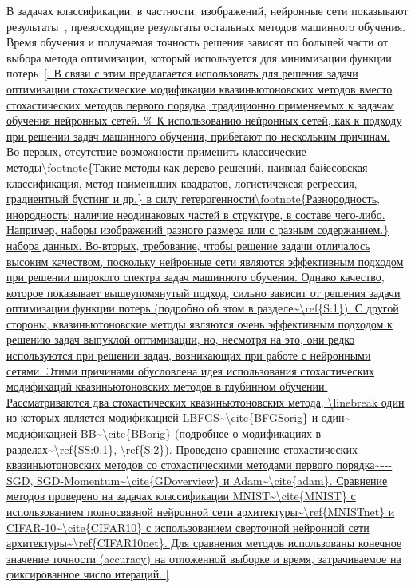 \documentclass[preprint,12pt]{elsarticle}
\begin{document}
В задачах классификации, в частности, изображений, нейронные сети показывают результаты~\cite{MNISTexperiments, CIFAR10experiments}, превосходящие результаты остальных методов машинного обучения. 
Время обучения и получаемая точность решения зависят по большей части от выбора метода оптимизации, который используется для минимизации функции потерь~\ref{. 
В связи с этим предлагается использовать для решения задачи оптимизации стохастические модификации квазиньютоновских методов вместо стохастических методов первого порядка, традиционно применяемых к задачам обучения нейронных сетей.


Рассматриваются два стохастических квазиньютоновских метода, \linebreak один из которых является модификацией LBFGS~\cite{BFGSorig} и один~--- модификацией BB~\cite{BBorig} (подробнее о модификациях в разделах~\ref{SS:0.1}, \ref{S:2}). 
Проведено сравнение стохастических квазиньютоновских методов со стохастическими методами первого порядка~--- SGD, SGD-Momentum~\cite{GDoverview} и Adam~\cite{adam}. 
Сравнение методов проведено на задачах классификации MNIST~\cite{MNIST} с использованием полносвязной нейронной сети архитектуры~\ref{MNISTnet} и CIFAR-10~\cite{CIFAR10} с использованием сверточной нейронной сети архитектуры~\ref{CIFAR10net}.
Для сравнения методов использованы  конечное значение точности (accuracy) на отложенной выборке и время, затрачиваемое на фиксированное число итераций.

}
\end{document}
